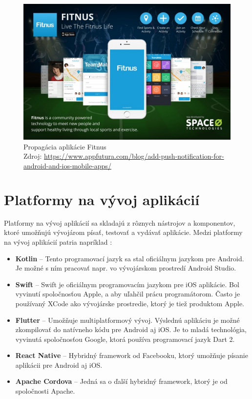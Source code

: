 \documentclass[10pt,twoside,slovak,a4paper]{article}
\begin{document}
\cite{pixelfield}

\begin{figure}[h!]
\includegraphics[scale=0.3]{propagacia}
\centering
\caption{Propagácia aplikácie Fitnus
\\ Zdroj: \url{https://www.appfutura.com/blog/add-push-notification-for-android-and-ios-mobile-apps/}}
\end{figure}



\section{Platformy na vývoj aplikácií}
\quad Platformy na vývoj aplikácií sa skladajú z rôznych nástrojov a komponentov, ktoré umožňujú vývojárom písať, testovať a vydávať aplikácie. Medzi platformy na vývoj aplikácií patria napríklad \cite{wiki1, pixelfield}:
\begin{itemize}
\item \textbf{Kotlin} – Tento programovací jazyk sa stal oficiálnym jazykom pre Android. Je možné s ním pracovať napr. vo vývojárskom prostredí Android Studio.
\item \textbf{Swift} – Swift je oficiálnym programovacím jazykom pre iOS aplikácie. Bol vyvinutí spoločnosťou Apple, a aby uľahčil prácu programátorom. Často je používaný XCode ako vývojárske prostredie, ktorý je tiež produktom Apple.
\item \textbf{Flutter} – Umožňuje multiplatformový vývoj. Výslednú aplikáciu je možné zkompilovať do natívneho kódu pre Android aj iOS. Je to mladá technológia, vyvinutá spoločnosťou Google, ktorá používa programovací jazyk Dart 2.
\item \textbf{React Native} – Hybridný framework od Facebooku, ktorý umožňuje písanie aplikácii pre Android aj iOS.
\item \textbf{Apache Cordova} – Jedná sa o ďalší hybridný framework, ktorý je od spoločnosti Apache.
\end{itemize}
\end{document}
